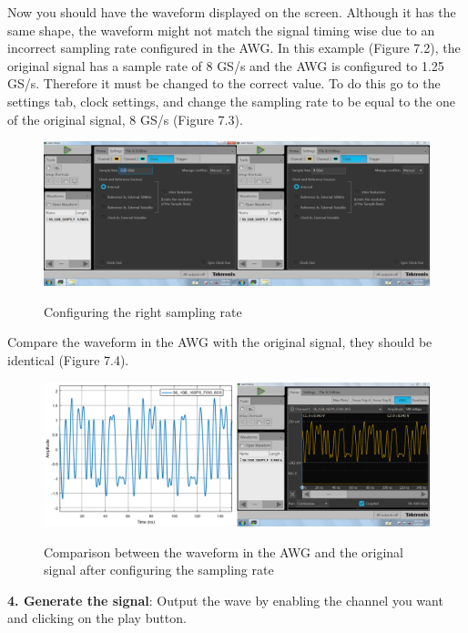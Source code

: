 Now you should have the waveform displayed on the screen. Although it has the same shape,  the waveform might not match the signal timing wise due to an incorrect sampling rate  configured in the AWG.
In this example (Figure 7.2), the original signal has a sample rate of 8 GS/s and the AWG is configured to 1.25 GS/s. Therefore it must be changed to the correct value.
To do this go to the settings tab, clock settings, and change the sampling rate to be equal to the one of the original signal, 8 GS/s (Figure 7.3).



\begin{figure}[h]
	\centering
	\includegraphics[width=\textwidth]{../mtools/sgnToWfm/figures/tutorial3}
	\label{TUT_ConfigSR}\caption{Configuring the right sampling rate}
\end{figure}

Compare the waveform in the AWG with the original signal, they should be identical (Figure 7.4).
\begin{figure}[h]
	\centering
	\includegraphics[width=\textwidth]{../mtools/sgnToWfm/figures/tutorial4}
	\label{TUT_CompGood}\caption{Comparison between the waveform in the AWG and the original signal after configuring the sampling rate}
\end{figure}
\bigskip

\noindent
\textbf{4. Generate the signal}:
Output the wave by enabling the channel you want and clicking on the play button.


% 